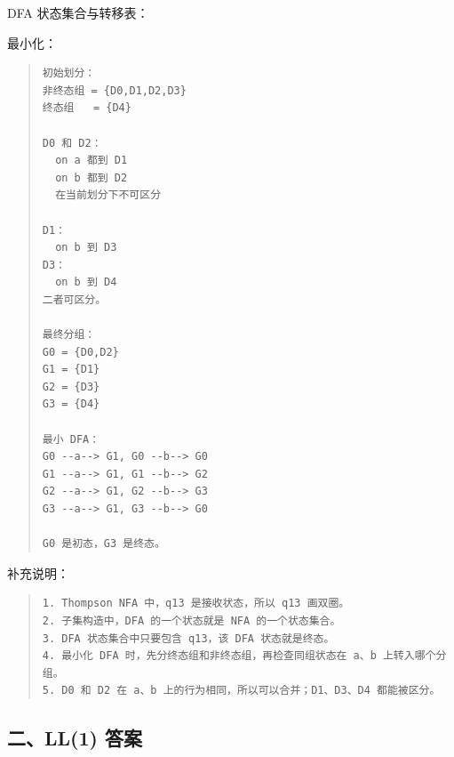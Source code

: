 \documentclass[UTF8,zihao=-4]{ctexart}
\begin{document}
DFA 状态集合与转移表：

\begin{center}
\footnotesize
{}
\end{center}

最小化：

\begin{quote}
\footnotesize
\begin{verbatim}
初始划分：
非终态组 = {D0,D1,D2,D3}
终态组   = {D4}

D0 和 D2：
  on a 都到 D1
  on b 都到 D2
  在当前划分下不可区分

D1：
  on b 到 D3
D3：
  on b 到 D4
二者可区分。

最终分组：
G0 = {D0,D2}
G1 = {D1}
G2 = {D3}
G3 = {D4}

最小 DFA：
G0 --a--> G1, G0 --b--> G0
G1 --a--> G1, G1 --b--> G2
G2 --a--> G1, G2 --b--> G3
G3 --a--> G1, G3 --b--> G0

G0 是初态，G3 是终态。
\end{verbatim}
\end{quote}

补充说明：

\begin{quote}
\footnotesize
\begin{verbatim}
1. Thompson NFA 中，q13 是接收状态，所以 q13 画双圈。
2. 子集构造中，DFA 的一个状态就是 NFA 的一个状态集合。
3. DFA 状态集合中只要包含 q13，该 DFA 状态就是终态。
4. 最小化 DFA 时，先分终态组和非终态组，再检查同组状态在 a、b 上转入哪个分组。
5. D0 和 D2 在 a、b 上的行为相同，所以可以合并；D1、D3、D4 都能被区分。
\end{verbatim}
\end{quote}

\subsection*{二、LL(1) 答案}
\end{document}

